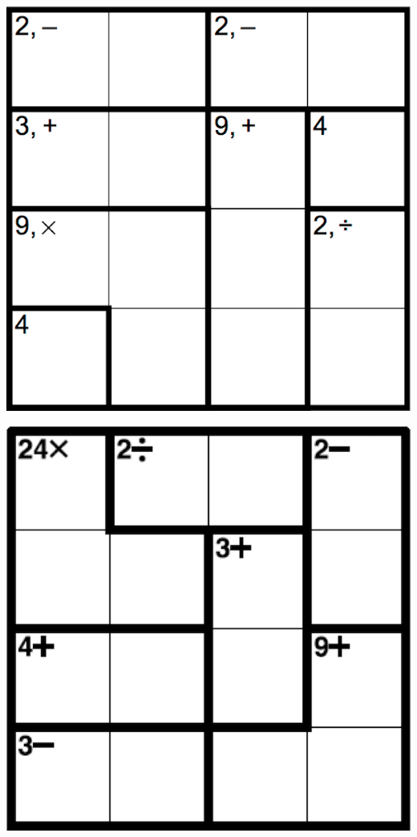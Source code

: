 
\includegraphics[scale=1]{Gambar/Lampiran/4x4_13.png}

\includegraphics[scale=1]{Gambar/Lampiran/4x4_14.png}
